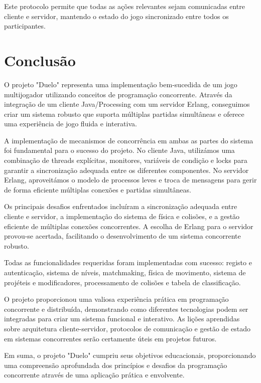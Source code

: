 \documentclass[12pt,a4paper]{report}
\begin{document}
Este protocolo permite que todas as ações relevantes sejam comunicadas entre cliente e servidor, mantendo o estado do jogo sincronizado entre todos os participantes.

\chapter{Conclusão}

O projeto "Duelo" representa uma implementação bem-sucedida de um jogo multijogador utilizando conceitos de programação concorrente. Através da integração de um cliente Java/Processing com um servidor Erlang, conseguimos criar um sistema robusto que suporta múltiplas partidas simultâneas e oferece uma experiência de jogo fluida e interativa.

A implementação de mecanismos de concorrência em ambas as partes do sistema foi fundamental para o sucesso do projeto. No cliente Java, utilizámos uma combinação de threads explícitas, monitores, variáveis de condição e locks para garantir a sincronização adequada entre os diferentes componentes. No servidor Erlang, aproveitámos o modelo de processos leves e troca de mensagens para gerir de forma eficiente múltiplas conexões e partidas simultâneas.

Os principais desafios enfrentados incluíram a sincronização adequada entre cliente e servidor, a implementação do sistema de física e colisões, e a gestão eficiente de múltiplas conexões concorrentes. A escolha de Erlang para o servidor provou-se acertada, facilitando o desenvolvimento de um sistema concorrente robusto.

Todas as funcionalidades requeridas foram implementadas com sucesso: registo e autenticação, sistema de níveis, matchmaking, física de movimento, sistema de projéteis e modificadores, processamento de colisões e tabela de classificação.

O projeto proporcionou uma valiosa experiência prática em programação concorrente e distribuída, demonstrando como diferentes tecnologias podem ser integradas para criar um sistema funcional e interativo. As lições aprendidas sobre arquitetura cliente-servidor, protocolos de comunicação e gestão de estado em sistemas concorrentes serão certamente úteis em projetos futuros.

Em suma, o projeto "Duelo" cumpriu seus objetivos educacionais, proporcionando uma compreensão aprofundada dos princípios e desafios da programação concorrente através de uma aplicação prática e envolvente.
\end{document}

